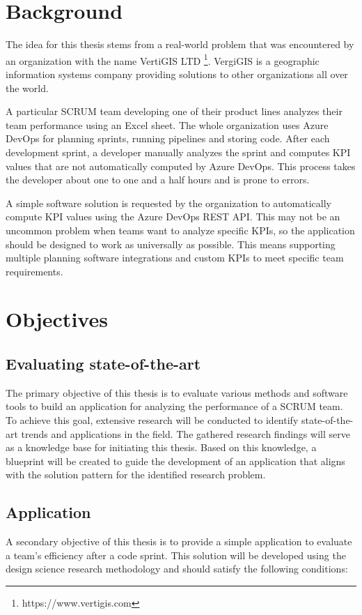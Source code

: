 \section{Background}\label{background-section}

The idea for this thesis stems from a real-world problem that was encountered by an 
organization with the name VertiGIS LTD \footnote{https://www.vertigis.com}. 
VergiGIS is a geographic information systems company
providing solutions to other organizations all over the world.

A particular SCRUM team developing one of their product
lines analyzes their team performance using an Excel sheet. 
The whole organization uses Azure DevOps for planning sprints, running pipelines and storing code.
After each development sprint, a developer manually analyzes the sprint and computes KPI values
that are not automatically computed by Azure DevOps.
This process takes the developer about one to one and a half hours and is prone to errors.

A simple software solution is requested by the organization to automatically compute KPI values using the 
Azure DevOps REST API.
This may not be an uncommon problem when teams want to analyze specific KPIs, so the application should be 
designed to work as universally as possible. 
This means supporting multiple planning software integrations and custom KPIs to meet specific team requirements.

\section{Objectives} \label{Chapter1-Objectives}

\subsection{Evaluating state-of-the-art}

The primary objective of this thesis is to evaluate various methods and software tools to 
build an application for analyzing the performance of a SCRUM team.
To achieve this goal, extensive research will be conducted to identify 
state-of-the-art trends and applications in the field. 
The gathered research findings will serve as a knowledge base for initiating this thesis. 
Based on this knowledge, a blueprint will be created to guide the development 
of an application that aligns with the solution pattern for the identified research problem.

\subsection{Application}
A secondary objective of this thesis is to provide a simple application to evaluate a team's efficiency after a code sprint. 
This solution will be developed using the design science research methodology and should satisfy the following conditions:

